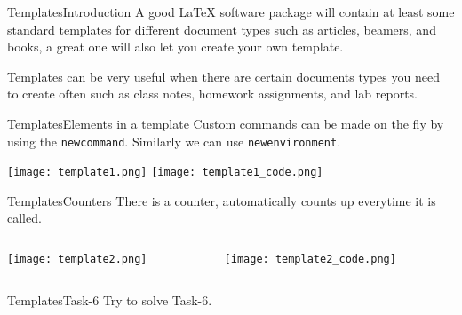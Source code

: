 \begin{frame}{Templates}{Introduction}
	A good LaTeX software package will contain at least some standard templates
	for different document types such as articles, beamers, and books, a great one will also
	let you create your own template. \vspace{1em}

	Templates can be very useful when there are certain
	documents types you need to create often such as class notes, homework assignments, and lab reports.
\end{frame}

\begin{frame}[fragile]{Templates}{Elements in a template}
    \footnotesize
    Custom commands can be made on the fly by using the \texttt{newcommand}.
    Similarly we can use \texttt{newenvironment}.

    \texttt{[image: template1.png]}
    \texttt{[image: template1\_code.png]}
\end{frame}


\begin{frame}[fragile]{Templates}{Counters}
    \footnotesize
    There is a counter, automatically counts up everytime it is called.

    \begin{columns}
        \begin{column}{0.3\textwidth}
            \texttt{[image: template2.png]}
        \end{column}
        \begin{column}{0.7\textwidth}
            \texttt{[image: template2\_code.png]}
        \end{column}
    \end{columns}
\end{frame}



\begin{frame}{Templates}{Task-6}
    Try to solve Task-6.
\end{frame}
